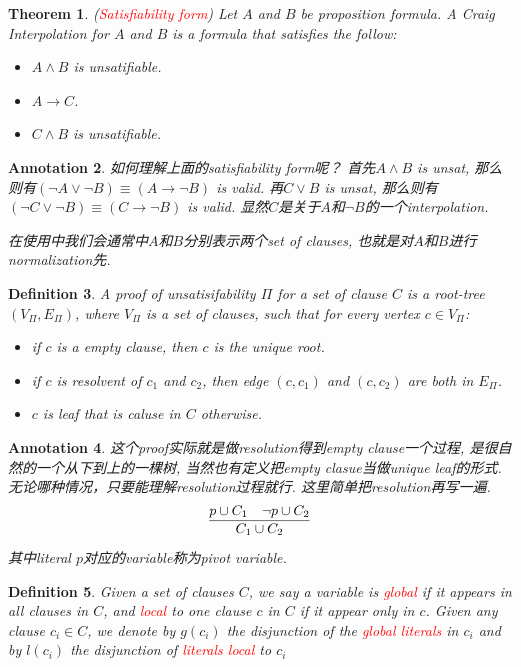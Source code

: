 \documentclass{article}
\newtheorem{theorem}{Theorem}[section]
\newtheorem{definition}[theorem]{Definition}
\newtheorem{annotation}[theorem]{Annotation}
\newcommand{\redt}[1]{\textcolor{red}{#1}}
\begin{document}
\begin{theorem}
\rm (\redt{Satisfiability form}) Let $A$ and $B$ be proposition formula. A Craig Interpolation for $A$ and $B$ is a formula that satisfies the follow:
\begin{itemize}
	\item $A \wedge B$ is unsatifiable.
	\item $A \to C$.
	\item $C \wedge B$ is unsatifiable.
\end{itemize}
\end{theorem}

\begin{annotation}
\rm 如何理解上面的satisfiability form呢？ 首先$A \wedge B$ is unsat, 那么则有$(\neg A \vee \neg B) \equiv (A \to \neg B)$ is valid. 再$C \vee B$ is unsat, 那么则有$(\neg C \vee \neg B) \equiv (C \to \neg B)$ is valid. 显然$C$是关于$A$和$\neg B$的一个interpolation.

在使用中我们会通常中$A$和$B$分别表示两个set of clauses, 也就是对$A$和$B$进行normalization先.  
\end{annotation}

\begin{definition}
\rm A proof of unsatisifability $\varPi$ for a set of clause $C$ is a root-tree $(V_\varPi, E_\varPi)$, where $V_\varPi$ is a set of clauses, such that for every vertex $c \in V_{\varPi}$:
\begin{itemize}
	\item if $c$ is a empty clause, then $c$ is the unique root.
	\item if $c$ is resolvent of $c_1$ and $c_2$, then edge $(c,c_1)$ and $(c,c_2)$ are both in $E_\varPi$.
	\item $c$ is leaf that is caluse in $C$ otherwise.
\end{itemize}
\end{definition}

\begin{annotation}
\rm 这个proof实际就是做resolution得到empty clause一个过程, 是很自然的一个从下到上的一棵树, 当然也有定义把empty clasue当做unique leaf的形式. 无论哪种情况，只要能理解resolution过程就行. 这里简单把resolution再写一遍.
\[
	\infer{C_1 \cup C_2}{p \cup C_1 & \neg p \cup C_2}
\]
其中literal $p$对应的variable称为pivot variable.
\end{annotation}

\begin{definition}
\rm Given a set of clauses $C$, we say a variable is \redt{global} if it appears in all clauses in $C$, and \redt{local} to one clause $c$ in $C$ if it appear only in $c$. Given any clause $c_i \in C$, we denote by $g(c_i)$ the disjunction of the \redt{global literals} in $c_i$ and by $l(c_i)$ the disjunction of \redt{literals local} to $c_i$ 
\end{definition}
\end{document}
